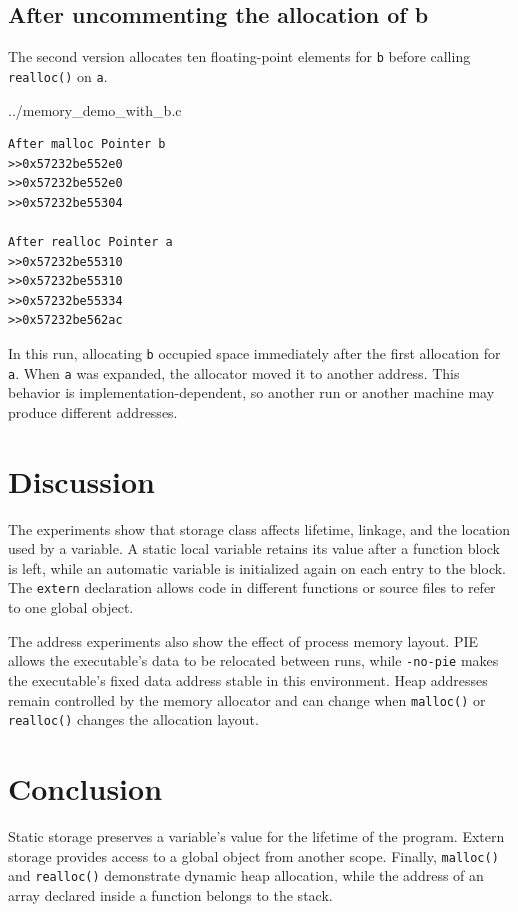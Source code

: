 \documentclass[12pt,a4paper]{article}
\begin{document}
\subsection{After uncommenting the allocation of b}

The second version allocates ten floating-point elements for \texttt{b} before
calling \texttt{realloc()} on \texttt{a}.


{../memory_demo_with_b.c}

\begin{lstlisting}[style=terminal,caption={Memory allocation output after enabling b}]
After malloc Pointer b
>>0x57232be552e0
>>0x57232be552e0
>>0x57232be55304

After realloc Pointer a
>>0x57232be55310
>>0x57232be55310
>>0x57232be55334
>>0x57232be562ac
\end{lstlisting}

In this run, allocating \texttt{b} occupied space immediately after the first
allocation for \texttt{a}. When \texttt{a} was expanded, the allocator moved it
to another address. This behavior is implementation-dependent, so another run
or another machine may produce different addresses.

\section{Discussion}

The experiments show that storage class affects lifetime, linkage, and the
location used by a variable. A static local variable retains its value after a
function block is left, while an automatic variable is initialized again on
each entry to the block. The \texttt{extern} declaration allows code in
different functions or source files to refer to one global object.

The address experiments also show the effect of process memory layout. PIE
allows the executable's data to be relocated between runs, while \texttt{-no-pie}
makes the executable's fixed data address stable in this environment. Heap
addresses remain controlled by the memory allocator and can change when
\texttt{malloc()} or \texttt{realloc()} changes the allocation layout.

\section{Conclusion}

Static storage preserves a variable's value for the lifetime of the program.
Extern storage provides access to a global object from another scope. Finally,
\texttt{malloc()} and \texttt{realloc()} demonstrate dynamic heap allocation,
while the address of an array declared inside a function belongs to the stack.
\end{document}
